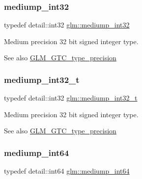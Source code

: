 \subsubsection{\texorpdfstring{mediump\+\_\+int32}{mediump\_int32}}
{\footnotesize\ttfamily typedef detail\+::int32 \hyperlink{group__gtc__type__precision_ga0660a752402702f420f13c686a7fff29}{glm\+::mediump\+\_\+int32}}

Medium precision 32 bit signed integer type. \begin{DoxySeeAlso}{See also}
\hyperlink{group__gtc__type__precision}{G\+L\+M\+\_\+\+G\+T\+C\+\_\+type\+\_\+precision} 
\end{DoxySeeAlso}
\mbox{\label{group__gtc__type__precision_gafd9b4bd9e4465aec63351b59100692c4}} 
\subsubsection{\texorpdfstring{mediump\+\_\+int32\+\_\+t}{mediump\_int32\_t}}
{\footnotesize\ttfamily typedef detail\+::int32 \hyperlink{group__gtc__type__precision_gafd9b4bd9e4465aec63351b59100692c4}{glm\+::mediump\+\_\+int32\+\_\+t}}

Medium precision 32 bit signed integer type. \begin{DoxySeeAlso}{See also}
\hyperlink{group__gtc__type__precision}{G\+L\+M\+\_\+\+G\+T\+C\+\_\+type\+\_\+precision} 
\end{DoxySeeAlso}
\mbox{\label{group__gtc__type__precision_ga603c695fe5cd677d3f72a81343e19a74}} 
\subsubsection{\texorpdfstring{mediump\+\_\+int64}{mediump\_int64}}
{\footnotesize\ttfamily typedef detail\+::int64 \hyperlink{group__gtc__type__precision_ga603c695fe5cd677d3f72a81343e19a74}{glm\+::mediump\+\_\+int64}}

